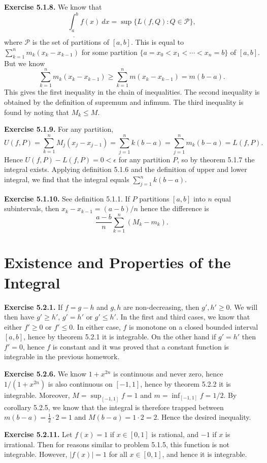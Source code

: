 \documentclass[12pt]{book}
\newcommand{\prb}[1]{\textbf{Exercise #1.}}
\begin{document}
\prb{5.1.8} We know that $$\underline{\int_a^b} f(x) \ dx = \sup \{L(f, Q): Q \in \mathcal{P}\},$$ where $\mathcal{P}$ is the set of partitions of $[a,b]$. This is equal to $\sum_{k=1}^n m_k (x_k - x_{k-1})$ for some partition $\{ a = x_0 < x_1 < \cdots < x_n = b\}$ of $[a,b]$. But we know $$\sum_{k=1}^n m_k (x_k - x_{k-1}) \geq \sum_{k=1}^n m (x_k - x_{k-1}) = m(b-a).$$ This gives the first inequality in the chain of inequalities. The second inequality is obtained by the definition of supremum and infimum. The third inequality is found by noting that $M_k \leq M$.

\prb{5.1.9} For any partition, $$U(f, P) = \sum_{k=1}^n M_j (x_j - x_{j-1}) = \sum_{j=1}^n k (b-a) = \sum_{j=1}^n m_k (b-a) = L(f, P).$$ Hence $U(f, P) - L(f, P) = 0 < \epsilon$ for any partition $P$, so by theorem 5.1.7 the integral exists. Applying definition 5.1.6 and the definition of upper and lower integral, we find that the integral equals $\sum_{j=1}^n k (b-a)$.

\prb{5.1.10} See definition 5.1.1. If $P$ partitions $[a,b]$ into $n$ equal subintervals, then $x_k - x_{k-1} = (a-b)/n$ hence the difference is $$\dfrac{a-b}{n} \sum_{k=1}^n (M_k - m_k).$$



\section{Existence and Properties of the Integral}

\prb{5.2.1} If $f = g-h$ and $g, h$ are non-decreasing, then $g', h' \geq 0$. We will then have $g' \geq h'$, $g' = h'$ or $g' \leq h'.$ In the first and third cases, we know that either $f' \geq 0$ or $f' \leq 0$. In either case, $f$ is monotone on a closed bounded interval $[a,b]$, hence by theorem 5.2.1 it is integrable. On the other hand if $g' = h'$ then $f' = 0$, hence $f$ is constant and it was proved that a constant function is integrable in the previous homework.

\prb{5.2.6} We know $1+x^{2n}$ is continuous and never zero, hence $1/(1+x^{2n})$ is also continuous on $[-1, 1]$, hence by theorem 5.2.2 it is integrable. Moreover, $M = \sup_{[-1, 1]} f = 1$ and $m = \inf_{[-1, 1]} f = 1/2$. By corollary 5.2.5, we know that the integral is therefore trapped between $m(b-a) = \frac{1}{2} \cdot 2 = 1$ and $M(b-a) = 1 \cdot 2 = 2.$ Hence the desired inequality.

\prb{5.2.11} Let $f(x) = 1$ if $x \in [0,1]$ is rational, and $-1$ if $x$ is irrational. Then for reasons similar to problem 5.1.5, this function is not integrable. However, $|f(x)| = 1$ for all $x \in [0,1]$, and hence it is integrable.
\end{document}
